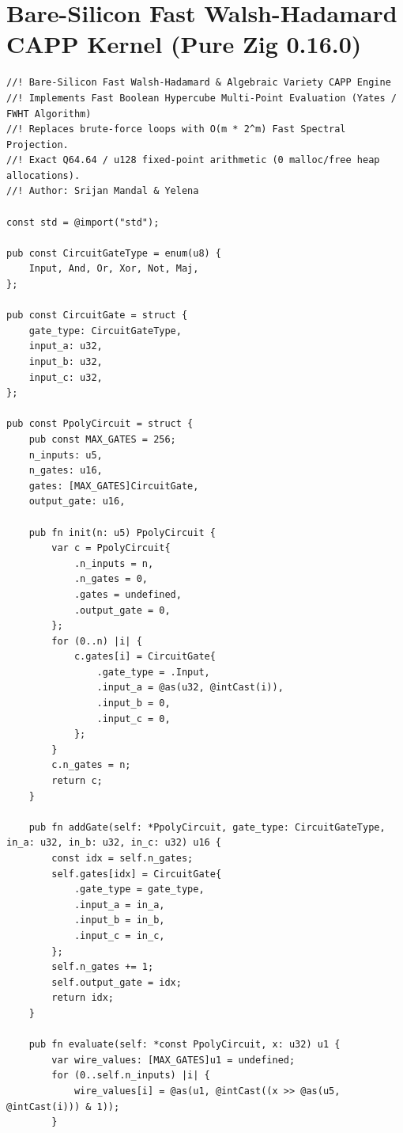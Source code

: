 \documentclass[11pt,a4paper]{article}
\theoremstyle{definition}
\theoremstyle{remark}
\begin{document}
\section{Bare-Silicon Fast Walsh-Hadamard CAPP Kernel (Pure Zig 0.16.0)}\label{app:ppoly_kernel}

\begin{lstlisting}
//! Bare-Silicon Fast Walsh-Hadamard & Algebraic Variety CAPP Engine
//! Implements Fast Boolean Hypercube Multi-Point Evaluation (Yates / FWHT Algorithm)
//! Replaces brute-force loops with O(m * 2^m) Fast Spectral Projection.
//! Exact Q64.64 / u128 fixed-point arithmetic (0 malloc/free heap allocations).
//! Author: Srijan Mandal & Yelena

const std = @import("std");

pub const CircuitGateType = enum(u8) {
    Input, And, Or, Xor, Not, Maj,
};

pub const CircuitGate = struct {
    gate_type: CircuitGateType,
    input_a: u32,
    input_b: u32,
    input_c: u32,
};

pub const PpolyCircuit = struct {
    pub const MAX_GATES = 256;
    n_inputs: u5,
    n_gates: u16,
    gates: [MAX_GATES]CircuitGate,
    output_gate: u16,

    pub fn init(n: u5) PpolyCircuit {
        var c = PpolyCircuit{
            .n_inputs = n,
            .n_gates = 0,
            .gates = undefined,
            .output_gate = 0,
        };
        for (0..n) |i| {
            c.gates[i] = CircuitGate{
                .gate_type = .Input,
                .input_a = @as(u32, @intCast(i)),
                .input_b = 0,
                .input_c = 0,
            };
        }
        c.n_gates = n;
        return c;
    }

    pub fn addGate(self: *PpolyCircuit, gate_type: CircuitGateType, in_a: u32, in_b: u32, in_c: u32) u16 {
        const idx = self.n_gates;
        self.gates[idx] = CircuitGate{
            .gate_type = gate_type,
            .input_a = in_a,
            .input_b = in_b,
            .input_c = in_c,
        };
        self.n_gates += 1;
        self.output_gate = idx;
        return idx;
    }

    pub fn evaluate(self: *const PpolyCircuit, x: u32) u1 {
        var wire_values: [MAX_GATES]u1 = undefined;
        for (0..self.n_inputs) |i| {
            wire_values[i] = @as(u1, @intCast((x >> @as(u5, @intCast(i))) & 1));
        }


\end{lstlisting}
\end{document}
